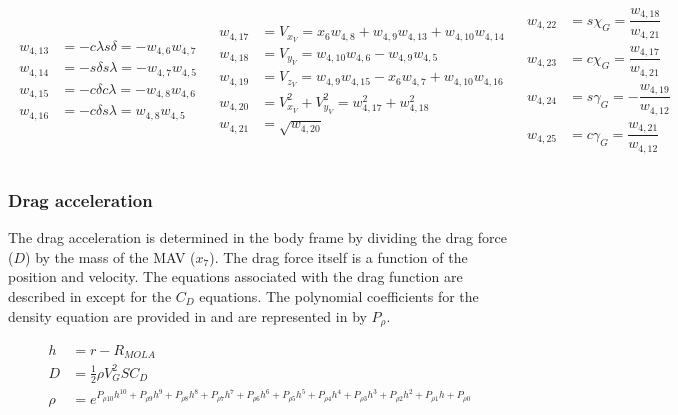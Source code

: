 \begin{align} \label{eq:VV}
\begin{split}
w_{4,13} &= -c\lambda s\delta  = -w_{4,6}w_{4,7} \\
w_{4,14} &= -s\delta s\lambda = -w_{4,7}w_{4,5} \\
w_{4,15} &= -c\delta c\lambda = -w_{4,8}w_{4,6} \\
w_{4,16} &= -c\delta s\lambda = w_{4,8}w_{4,5} \\
\end{split}
&
\begin{split}
w_{4,17} &= V_{x_{V}} = x_{6}w_{4,8}+w_{4,9}w_{4,13}+w_{4,10}w_{4,14} \\
w_{4,18} &= V_{y_{V}} = w_{4,10}w_{4,6}-w_{4,9}w_{4,5} \\
w_{4,19} &= V_{z_{V}} = w_{4,9}w_{4,15}-x_{6}w_{4,7}+w_{4,10}w_{4,16} \\
w_{4,20} &= V_{x_{V}}^{2}+V_{y_{V}}^{2} = w_{4,17}^{2}+w_{4,18}^{2} \\
w_{4,21} &= \sqrt{w_{4,20}} \\
\end{split}
&
\begin{split}
w_{4,22} &= s\chi_{G} = \dfrac{w_{4,18}}{w_{4,21}} \\
w_{4,23} &= c\chi_{G} = \dfrac{w_{4,17}}{w_{4,21}} \\
w_{4,24} &= s\gamma_{G} = -\dfrac{w_{4,19}}{w_{4,12}} \\
w_{4,25} &= c\gamma_{G} = \dfrac{w_{4,21}}{w_{4,12}} \\
\end{split}
\end{align}



 \subsubsection{Drag acceleration}
 \label{subsubsec:tsiDrag}
The drag acceleration is determined in the body frame by dividing the drag force ($D$) by the mass of the \ac{MAV} ($x_{7}$). The drag force itself is a function of the position and velocity. The equations associated with the drag function are described in  except for the $C_{D}$ equations. The polynomial coefficients for the density equation are provided in  and are represented in  by $P_{\rho}$.

 \begin{equation} \label{eq:drag}
\begin{split}
h &= r-R_{MOLA} \\
D &= \frac{1}{2}\rho V_{G}^{2}SC_{D}\\
\rho &= e^{P_{\rho 10}h^{10}+P_{\rho 9}h^{9}+P_{\rho 8}h^{8}+P_{\rho 7}h^{7}+P_{\rho 6}h^{6}+P_{\rho 5}h^{5}+P_{\rho 4}h^{4}+P_{\rho 3}h^{3}+P_{\rho 2}h^{2}+P_{\rho 1}h+P_{\rho 0}} \\
\end{split}
\end{equation}

